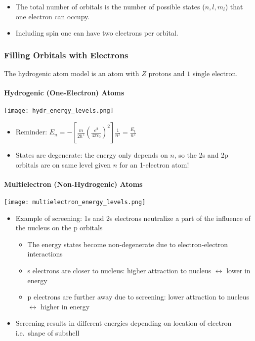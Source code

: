 
\begin{itemize}
    \item The total number of orbitals is the number of possible states ($n,l,m_l$) that one electron can occupy.
    \item Including spin one can have two electrons per orbital.
\end{itemize}

\subsubsection{Filling Orbitals with Electrons}
The hydrogenic atom model is an atom with $Z$ protons and $1$ single electron.
\paragraph{Hydrogenic (One-Electron) Atoms}


\begin{center}
    \texttt{[image: hydr\_energy\_levels.png]}
\end{center}
\begin{itemize}
    \item Reminder: $E_n = -\left[\frac{m}{2\hbar^2}{\left(\frac{e^2}{4\pi\epsilon_0}\right)}^2\right]\frac{1}{n^2} = \frac{E_1}{n^2}$
    \item States are degenerate: the energy only depends on $n$, so the 2s and 2p orbitals are on same level given $n$ for an 1-electron atom!
\end{itemize}

\paragraph{Multielectron (Non-Hydrogenic) Atoms}


\begin{center}
    \texttt{[image: multielectron\_energy\_levels.png]}
\end{center}
\begin{itemize}
    \item Example of screening: 1s and 2s electrons neutralize a part of the influence of the nucleus on the p orbitals
          \begin{itemize}
              \item The energy states become non-degenerate due to electron-electron interactions
              \item s electrons are closer to nucleus: higher attraction to nucleus $\leftrightarrow$ lower in energy
              \item p electrons are further away due to screening: lower attraction to nucleus $\leftrightarrow$ higher in energy
          \end{itemize}
    \item Screening results in different energies depending on location of electron i.e.\ shape of subshell
\end{itemize}

